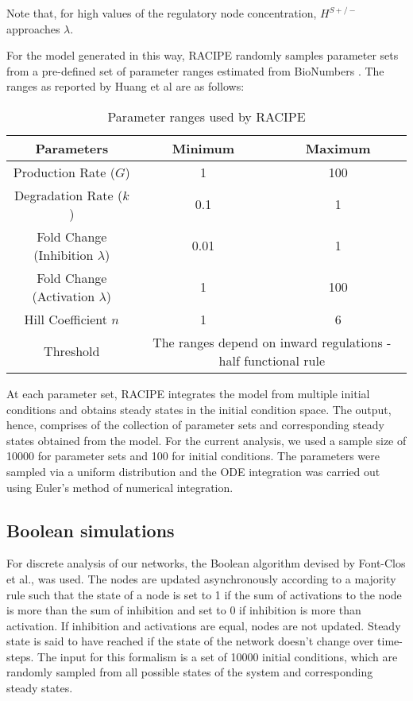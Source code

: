 \documentclass[preprint,review,12pt]{elsarticle}
\begin{document}
	Note that, for high values of the regulatory node concentration, $H^{S+/-}$ approaches $\lambda$.
	
	For the model generated in this way, RACIPE randomly samples parameter sets from a pre-defined set of parameter ranges estimated from BioNumbers \cite{Milo2009}. The ranges as reported by Huang et al \cite{Huang2018} are as follows:
    \begin{center}
	\begin{table}[h]
	    \centering
	    \color{red}
	    \caption{Parameter ranges used by RACIPE }
	    \label{tab:my_label}
	    \begin{tabular}{|c|c|c|}
	    \hline
	     \large{\textbf{Parameters}} & \large{\textbf{Minimum}} & \large{\textbf{Maximum}} \\
	     \hline
	     Production Rate ($G$) & 1 & 100\\
	     \hline
	     Degradation Rate ($k$)& 0.1 & 1\\
	     \hline
	     Fold Change (Inhibition $\lambda$) & 0.01 & 1\\
	     \hline
	     Fold Change (Activation $\lambda$) & 1 & 100\\
	     \hline
	     Hill Coefficient $n$ & 1 & 6\\
	     \hline
	     Threshold &  \multicolumn{2}{c|}{The ranges depend on inward regulations - half functional rule}\\
	     \hline
	\end{tabular}
\end{table}
\end{center}

	At each parameter set, RACIPE integrates the model from multiple initial conditions and obtains steady states in the initial condition space. 
	\color{black}The output, hence, comprises of the collection of parameter sets and corresponding steady states obtained from the model. 
	For the current analysis, we used a sample size of 10000 for parameter sets and 100 for initial conditions. The parameters were sampled via a uniform distribution and the ODE integration was carried out using Euler’s method of numerical integration.
	\newline
	
	    
				
	
	\subsection{Boolean simulations}
	For discrete analysis of our networks, the Boolean algorithm devised by Font-Clos et al., \cite{Font-Clos2018} was used. The nodes are updated asynchronously according to a majority rule such that the state of a node is set to 1 if the sum of activations to the node is more than the sum of inhibition and set to 0 if inhibition is more than activation. If inhibition and activations are equal, nodes are not updated. Steady state is said to have reached if the state of the network doesn’t change over time-steps. The input for this formalism is a set of 10000 initial conditions, which are randomly sampled from all possible states of the system and corresponding steady states. 
	
\end{document}
